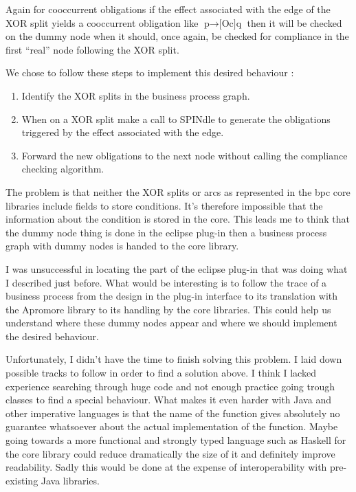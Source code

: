 \documentclass[10pt]{report}
\begin{document}
Again for cooccurrent obligations if the effect associated with the edge of the XOR split yields a cooccurrent obligation like $\text{p} \rightarrow \text{[Oc]q}$ then it will be checked on the dummy node when it should, once again, be checked for compliance in the first \enquote{real} node following the XOR split.

We chose to follow these steps to implement this desired behaviour :
\begin{enumerate}
\item Identify the XOR splits in the business process graph.
\item When on a XOR split make a call to SPINdle to generate the obligations triggered by the effect associated with the edge.
\item Forward the new obligations to the next node without calling the compliance checking algorithm.
\end{enumerate}

The problem is that neither the XOR splits or arcs as represented in the bpc core libraries include fields to store conditions. It's therefore impossible that the information about the condition is stored in the core. This leads me to think that the dummy node thing is done in the eclipse plug-in then a business process graph with dummy nodes is handed to the core library. 

I was unsuccessful in locating the part of the eclipse plug-in that was doing what I described just before. What would be interesting is to follow the trace of a business process from the design in the plug-in interface to its translation with the Apromore library to its handling by the core libraries. This could help us understand where these dummy nodes appear and where we should implement the desired behaviour.

Unfortunately, I didn't have the time to finish solving this problem. I laid down possible tracks to follow in order to find a solution above. I think I lacked experience searching through huge code and not enough practice going trough classes to find a special behaviour. What makes it even harder with Java and other imperative languages is that the name of the function gives absolutely no guarantee whatsoever about the actual implementation of the function. Maybe going towards a more functional and strongly typed language such as Haskell for the core library could reduce dramatically the size of it and definitely improve readability. Sadly this would be done at the expense of interoperability with pre-existing Java libraries.
\end{document}
